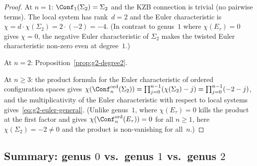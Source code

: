\begin{proof}
At $n = 1$: $\Conf_1(\Sigma_2) = \Sigma_2$ and the KZB
connection is trivial (no pairwise terms).
The local system has rank~$d = 2$ and the Euler
characteristic is
$\chi = d \cdot \chi(\Sigma_2) = 2 \cdot (-2) = -4$.
(In contrast to genus~$1$ where $\chi(E_\tau) = 0$
gives $\chi = 0$, the negative Euler characteristic of
$\Sigma_2$ makes the twisted Euler characteristic non-zero
even at degree~$1$.)

At $n = 2$: Proposition~\ref{prop:g2-degree2}.

At $n \geq 3$: the product formula for the Euler
characteristic of ordered configuration spaces gives
$\chi(\Conf_n^{\mathrm{ord}}(\Sigma_2))
= \prod_{j=0}^{n-1}(\chi(\Sigma_2) - j)
= \prod_{j=0}^{n-1}(-2 - j)$, and
the multiplicativity of the Euler characteristic with
respect to local systems
gives~\eqref{eq:g2-euler-general}.
(Unlike genus~$1$, where $\chi(E_\tau) = 0$ kills the
product at the first factor and gives
$\chi(\Conf_n^{\mathrm{ord}}(E_\tau)) = 0$ for all
$n \geq 1$, here $\chi(\Sigma_2) = -2 \neq 0$ and the
product is non-vanishing for all~$n$.)
\end{proof}

\subsection{Summary: genus $0$ vs.\ genus $1$ vs.\
genus $2$}
\label{subsec:genus-comparison-table}

